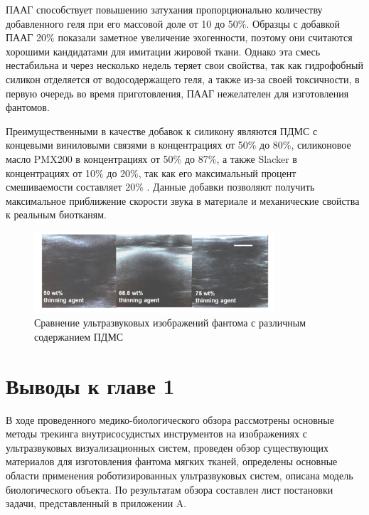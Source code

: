ПААГ способствует повышению затухания пропорционально количеству добавленного геля при его массовой доле от 10 до 50\%. Образцы с добавкой ПААГ 20\% показали заметное увеличение эхогенности, поэтому они считаются хорошими кандидатами для имитации жировой ткани. Однако эта смесь нестабильна и через несколько недель теряет свои свойства, так как гидрофобный силикон отделяется от водосодержащего геля, а также из-за своей токсичности, в первую очередь во время приготовления, ПААГ нежелателен для изготовления фантомов.

Преимущественными в качестве добавок к силикону являются ПДМС с концевыми виниловыми связями в концентрациях от 50\% до 80\%, силиконовое масло PMX200 в концентрациях от 50\% до 87\%, а также Slacker в концентрациях от 10\% до 20\%, так как его максимальный процент смешиваемости составляет 20\% \cite{litlink60}. Данные добавки позволяют получить максимальное приближение скорости звука в материале и механические свойства к реальным биотканям.

\begin{figure}[H]
\begin{center}
\includegraphics[width=0.8\textwidth]{Рисунки/ПДМС.png}
\caption{\centering Сравнение ультразвуковых изображений фантома с различным содержанием ПДМС}
\label{оболочка}
\end{center}
\end{figure}

\section{Выводы к главе 1}
В ходе проведенного медико-биологического обзора рассмотрены основные методы трекинга внутрисосудистых инструментов на изображениях с ультразвуковых визуализационных систем, проведен обзор существующих материалов для изготовления фантома мягких тканей, определены основные области применения роботизированных ультразвуковых систем, описана модель биологического объекта. По результатам обзора составлен лист постановки задачи, представленный в приложении A.







